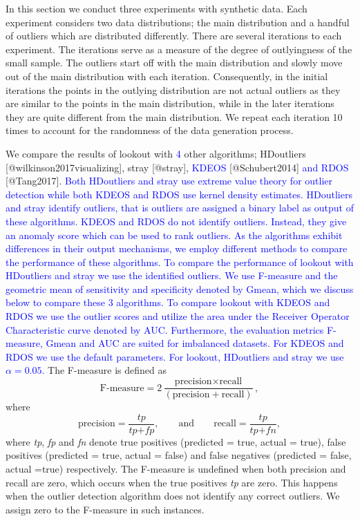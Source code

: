 \documentclass[
]{article}
\begin{document}
In this section we conduct three experiments with synthetic data. Each
experiment considers two data distributions; the main distribution and a
handful of outliers which are distributed differently. There are several
iterations to each experiment. The iterations serve as a measure of the
degree of outlyingness of the small sample. The outliers start off with
the main distribution and slowly move out of the main distribution with
each iteration. Consequently, in the initial iterations the points in
the outlying distribution are not actual outliers as they are similar to
the points in the main distribution, while in the later iterations they
are quite different from the main distribution. We repeat each iteration
10 times to account for the randomness of the data generation process.

We compare the results of lookout with \textcolor{blue}{4} other
algorithms; HDoutliers {[}@wilkinson2017visualizing{]}, stray
{[}@stray{]}, \textcolor{blue}{KDEOS} {[}@Schubert2014{]}
\textcolor{blue}{ and RDOS} {[}@Tang2017{]}.
\textcolor{blue}{ Both HDoutliers and stray use extreme value theory for outlier detection while both KDEOS and RDOS use kernel density estimates. HDoutliers and stray identify outliers, that is outliers are assigned a binary label as output of these algorithms. KDEOS and RDOS do not identify outliers. Instead, they give an anomaly score which can be used to rank outliers. As the algorithms exhibit differences in their output mechanisms, we employ different methods to compare the performance of these algorithms. To compare the performance of lookout with HDoutliers and stray we use the identified outliers. We use F-measure and the geometric mean of sensitivity and specificity denoted by Gmean, which we discuss below to compare these 3 algorithms. To compare lookout with KDEOS and RDOS we use the outlier scores and utilize the area under the Receiver Operator Characteristic curve denoted by AUC. Furthermore, the evaluation metrics F-measure, Gmean and AUC are suited for imbalanced datasets. For KDEOS and RDOS we use the default parameters. For lookout, HDoutliers and stray we use $\alpha = 0.05$. }
The F-measure is defined as \begin{equation}\label{eq:fmeasure}
    \text{F-measure} = 2\frac{\text{precision} \times \text{recall}}{\left( \text{precision} + \text{recall} \right) }  ,
\end{equation} where \begin{equation}\label{eq:pr}
    \text{precision} = \frac{ \textit{tp} }{\textit{tp} + \textit{fp}}  , \qquad \text{and} \qquad \text{recall} = \frac{\textit{tp}}{\textit{tp} + \textit{fn}}  ,
\end{equation} where \emph{tp}, \emph{fp} and \emph{fn} denote true
positives (predicted = true, actual = true), false positives (predicted
= true, actual = false) and false negatives (predicted = false, actual
=true) respectively. The F-measure is undefined when both precision and
recall are zero, which occurs when the true positives \emph{tp} are
zero. This happens when the outlier detection algorithm does not
identify any correct outliers. We assign zero to the F-measure in such
instances.
\end{document}
